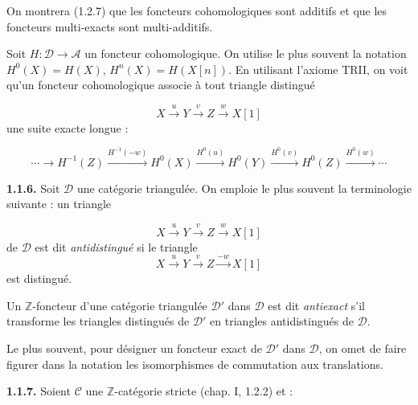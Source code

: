%
\begingroup
\small
\setlength{\abovedisplayskip}{4pt plus 2pt minus 2pt}%
\setlength{\belowdisplayskip}{4pt plus 2pt minus 2pt}%

\noindent On montrera (1.2.7) que les foncteurs cohomologiques sont
additifs et que les foncteurs multi-exacts sont multi-additifs.

Soit $H\colon\mathcal D\longrightarrow\mathcal A$ un foncteur
cohomologique. On utilise le plus souvent la notation
$H^0(X)=H(X)$, $H^n(X)=H(X[n])$. En utilisant l'axiome TRII, on voit
qu'un foncteur cohomologique associe à tout triangle distingué

\[
  X\xrightarrow{u}Y\xrightarrow{v}Z\xrightarrow{w}X[1]
\]
une suite exacte longue :

\begin{equation}
  \cdots\longrightarrow H^{-1}(Z)
  \xrightarrow{H^{-1}(-w)}H^0(X)
  \xrightarrow{H^0(u)}H^0(Y)
  \xrightarrow{H^0(v)}H^0(Z)
  \xrightarrow{H^0(w)}\cdots
  \tag{1.1.5.1}
\end{equation}

\medskip
\noindent\textbf{1.1.6.}\quad
Soit $\mathcal D$ une catégorie triangulée. On emploie le plus souvent
la terminologie suivante : un triangle

\[
  X\xrightarrow{u}Y\xrightarrow{v}Z\xrightarrow{w}X[1]
\]
de $\mathcal D$ est dit \emph{antidistingué} si le triangle
\[
  X\xrightarrow{u}Y\xrightarrow{v}Z\xrightarrow{-w}X[1]
\]
est distingué.

Un $\mathbb Z$-foncteur d'une catégorie triangulée $\mathcal D'$ dans
$\mathcal D$ est dit \emph{antiexact} s'il transforme les triangles
distingués de $\mathcal D'$ en triangles antidistingués de $\mathcal D$.

Le plus souvent, pour désigner un foncteur exact de $\mathcal D'$ dans
$\mathcal D$, on omet de faire figurer dans la notation les isomorphismes
de commutation aux translations.

\medskip
\noindent\textbf{1.1.7.}\quad
Soient $\mathcal C$ une $\mathbb Z$-catégorie stricte (chap. I, 1.2.2)
et :

